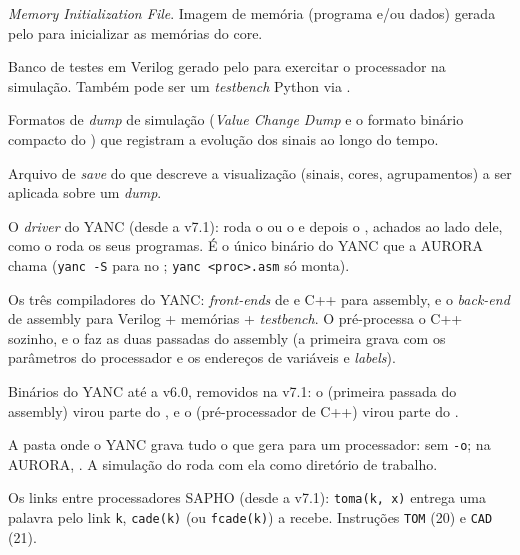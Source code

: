 \begin{description}[style=nextline,leftmargin=0pt,font=\bfseries\ttfamily]
\item[\file{.mif}] \textit{Memory Initialization File}. Imagem de memória (programa e/ou dados)
gerada pelo  para inicializar as memórias do core.

\item[testbench (\file{\_tb.v})] Banco de testes em Verilog gerado pelo  para exercitar
o processador na simulação. Também pode ser um \textit{testbench} Python via .

\item[VCD / FST] Formatos de \textit{dump} de simulação (\textit{Value Change Dump} e o formato
binário compacto do ) que registram a evolução dos sinais ao longo do tempo.

\item[\file{.gtkw}] Arquivo de \textit{save} do  que descreve a visualização
(sinais, cores, agrupamentos) a ser aplicada sobre um \textit{dump}.

\item[yanc] O \textit{driver} do YANC (desde a v7.1): roda o  ou o  e
depois o , achados ao lado dele, como o  roda os seus programas. É o único
binário do YANC que a AURORA chama (\lstinline|yanc -S| para no ; \lstinline|yanc <proc>.asm|
só monta).

\item[cmmcomp / cppcomp / asmcomp] Os três compiladores do YANC: \textit{front-ends} de \cmm{} e
C++ para assembly, e o \textit{back-end} de assembly para Verilog + memórias + \textit{testbench}.
O  pré-processa o C++ sozinho, e o  faz as duas passadas do assembly
(a primeira grava  com os parâmetros do processador e os endereços de
variáveis e \textit{labels}).

\item[appcomp / cpppp] Binários do YANC até a v6.0, removidos na v7.1: o  (primeira
passada do assembly) virou parte do , e o  (pré-processador de C++)
virou parte do .

\item[pasta de saída] A pasta onde o YANC grava tudo o que gera para um processador:
 sem \lstinline|-o|; na AURORA, . A simulação do
 roda com ela como diretório de trabalho.

\item[toma / cade] Os links entre processadores SAPHO (desde a v7.1): \lstinline|toma(k, x)| entrega
uma palavra pelo link \lstinline|k|, \lstinline|cade(k)| (ou \lstinline|fcade(k)|) a recebe. Instruções
\lstinline|TOM| (20) e \lstinline|CAD| (21).


\end{description}
